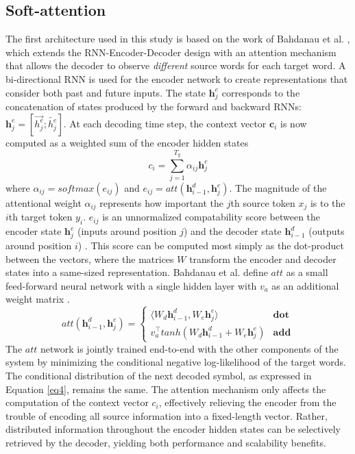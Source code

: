 \documentclass[a4paper]{article}
\begin{document}
\subsection{Soft-attention}

The first architecture used in this study is based on the work of Bahdanau et al. \cite{bahdanau2014neural}, which extends the RNN-Encoder-Decoder design with an attention mechanism that allows the decoder to observe \emph{different} source words for each target word. A bi-directional RNN is used for the encoder network to create representations that consider both past and future inputs. The state $\mathbf h^e_j$ corresponds to the concatenation of states produced by the forward and backward RNNs: $\mathbf h^e_j = [\overrightarrow{h^e_j} ; \overleftarrow{h^e_j}]$. At each decoding time step, the context vector $\mathbf c_{i}$ is now computed as a weighted sum of the encoder hidden states
\begin{equation}
 	c_{i} = \sum\limits_{j=1}^{T_y} {\alpha}_{{i}{j}}{\mathbf h^e_j}
  \label{eq6}
\end{equation}
where ${\alpha}_{{i}{j}} = softmax(e_{{i}{j}})$ and $e_{{i}{j}} = att(\mathbf h^d_{i-1}, \mathbf h^e_j)$. The magnitude of the attentional weight ${\alpha}_{{i}{j}}$ represents how important the $j$th source token $x_j$ is to the $i$th target token $y_i$. $e_{{i}{j}}$ is an unnormalized compatability score between the encoder state $\mathbf h^e_j$ (inputs around position $j$) and the decoder state $\mathbf h^d_{i-1}$ (outputs around position $i$) \cite{bahdanau2014neural, britz2017massive}. This score can be computed most simply as the dot-product between the vectors, where the matrices $W$ transform the encoder and decoder states into a same-sized representation. Bahdanau et al. define $att$ as a small feed-forward neural network with a single hidden layer with $v_a$ as an additional weight matrix \cite{bahdanau2014neural}.
\begin{equation}
 	 att(\mathbf h^d_{i-1}, \mathbf h^e_j) = 
 	\begin{cases}
   	\langle W_d \mathbf h^d_{i-1}, W_e \mathbf h^e_j \rangle  & \mathbf {dot} \\
	v_a^\top tanh(W_d \mathbf h^d_{i-1} + W_e \mathbf h^e_j)  & \mathbf {add}
    \end{cases}	
   \label{eq7}
\end{equation}
The $att$ network is jointly trained end-to-end with the other components of the system by minimizing the conditional negative log-likelihood of the target words. The conditional distribution of the next decoded symbol, as expressed in Equation \ref{eq4}, remains the same. The attention mechanism only affects the computation of the context vector $c_{i}$, effectively relieving the encoder from the trouble of encoding all source information into a fixed-length vector. Rather, distributed information throughout the encoder hidden states can be selectively retrieved by the decoder, yielding both performance and scalability benefits.
\end{document}
